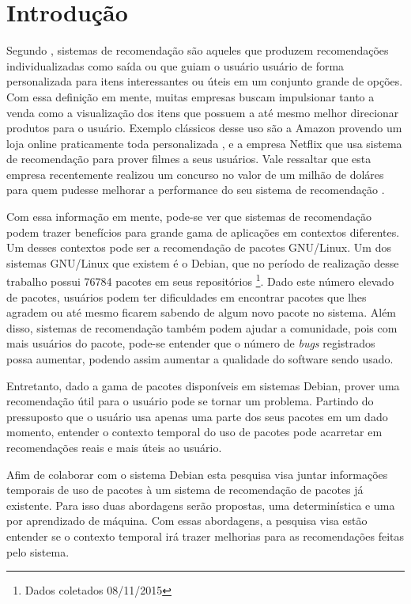 \chapter*[Introdução]{Introdução}

Segundo , sistemas de recomendação são aqueles que
produzem recomendações individualizadas como saída ou que guiam o usuário
usuário de forma personalizada para itens interessantes ou úteis em um conjunto
grande de opções. Com essa definição em mente, muitas empresas buscam
impulsionar tanto a venda como a visualização dos itens que possuem a até mesmo
melhor direcionar produtos para o usuário. Exemplo clássicos desse uso são a
Amazon provendo um loja online praticamente toda personalizada
\cite{jannach2008finding}, e a empresa Netflix que usa sistema de recomendação
para prover filmes a seus usuários. Vale ressaltar que esta empresa recentemente
realizou um concurso no valor de um milhão de doláres para quem pudesse melhorar
a performance do seu sistema de recomendação \cite{koren2009matrix}.

Com essa informação em mente, pode-se ver que sistemas de recomendação podem
trazer benefícios para grande gama de aplicações em contextos diferentes. Um
desses contextos pode ser a recomendação de pacotes GNU/Linux. Um dos sistemas
GNU/Linux que existem é o Debian, que no período de realização desse trabalho
possui 76784 pacotes em seus repositórios \footnote{Dados coletados
08/11/2015}. Dado este número elevado de pacotes, usuários podem ter
dificuldades em encontrar pacotes que lhes agradem ou até mesmo ficarem sabendo
de algum novo pacote no sistema. Além disso, sistemas de recomendação também
podem ajudar a comunidade, pois com mais usuários do pacote, pode-se entender que
o número de \textit{bugs} registrados possa aumentar, podendo assim aumentar a qualidade
do software sendo usado.

Entretanto, dado a gama de pacotes disponíveis em sistemas Debian, prover uma
recomendação útil para o usuário pode se tornar um problema. Partindo do
pressuposto que o usuário usa apenas uma parte dos seus pacotes em um dado
momento, entender o contexto temporal  do uso de pacotes pode acarretar em recomendações reais e
mais úteis ao usuário.

Afim de colaborar com o sistema Debian esta pesquisa visa juntar informações
temporais de uso de pacotes à um sistema de recomendação de pacotes já existente.
Para isso duas abordagens serão propostas, uma determinística e uma por aprendizado
de máquina. Com essas abordagens, a pesquisa visa estão entender se o contexto temporal
irá trazer melhorias para as recomendações feitas pelo sistema.

